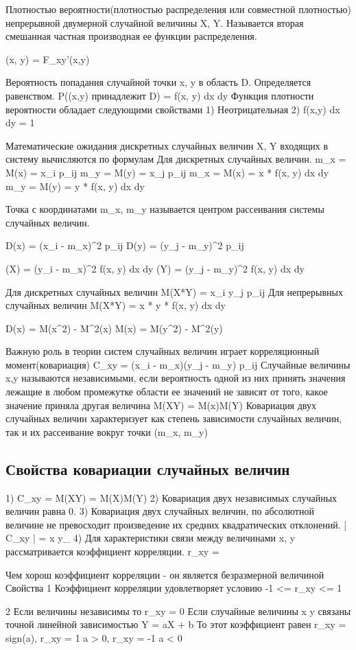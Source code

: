 \documentclass[a4paper]{article}
\begin{document}
Плотностью вероятности(плотностью распределения или совместной плотностью) непрерывной двумерной случайной величины X, Y. Называется вторая смешанная частная производная ее функции распределения.

\phi(x, y) = F_{xy}'(x,y)

Вероятность попадания случайной точки x, y в область D. Определяется равенством.
P((x,y) принадлежит D) = \int\int f(x, y) dx dy
Функция плотности вероятности обладает следующими свойствами
1) Неотрицательная
2) \int\int f(x,y) dx dy = 1

Математические ожидания дискретных случайных величин X, Y входящих в систему вычисляются по формулам
Для дискретных случайных величин.
m_x = M(x) = \Sigma\Sigma x_i p_{ij}
m_y = M(y) = \Sigma\Sigma x_j p_{ij}
m_x = M(x) = \int\int x * f(x, y) dx dy
m_y = M(y) = \int\int y * f(x, y) dx dy

Точка с координатами m_x, m_y называется центром рассеивания системы случайных величин.

D(x) = \Sigma\Sigma(x_i - m_x)^2 p_{ij} 
D(y) = \Sigma\Sigma(y_j - m_y)^2 p_{ij} 

(X) = \int\int (y_i - m_x)^2 f(x, y) dx dy
(Y) = \int\int (y_j - m_y)^2 f(x, y) dx dy

Для дискретных случайных величин 
M(X*Y) = \Sigma\Sigma x_i y_j p_{ij}
Для непрерывных случайных величин
M(X*Y) = \int\int x * y * f(x, y) dx dy

D(x) = M(x^2) - M^2(x)
M(x) = M(y^2) - M^2(y)

Важную роль в теории систем случайных величин играет корреляционный момент(ковариация) C_{xy} = \Sigma\Sigma(x_i - m_x)(y_j - m_y) p_{ij}
Случайные величины x,y называются независимыми, если вероятность одной из них принять значения лежащие в любом промежутке области ее значений не зависят от того, какое значение приняла другая величина
M(XY) = M(x)M(Y)
Ковариация двух случайных величин характеризует как степень зависимости случайных величин, так и их рассеивание вокруг точки (m_x, m_y)
\subsection{Свойства ковариации случайных величин}

1) C_{xy} = M(XY) = M(X)M(Y)
2) Ковариация двух независимых случайных величин равна 0. 
3) Ковариация двух случайных величин, по абсолютной величине не превосходит произведение их средних квадратических отклонений.
| C_{xy} |  = \sigma x \sigma y_
4) Для характеристики связи между величинами x, y рассматривается коэффициент корреляции.
r_{xy} =  

Чем хорош коэффициент корреляции - он является безразмерной величиной
Свойства 
1 Коэффициент корреляции удовлетворяет условию 
-1 <= r_{xy} <= 1

2 Если величины независимы то r_{xy} = 0
Если случайные величины x y связаны точной линейной зависимостью Y = aX + b
То этот коэффициент равен r_{xy} = sign(a), r_{xy} = 1 a > 0, r_{xy} = -1 a < 0
\end{document}

